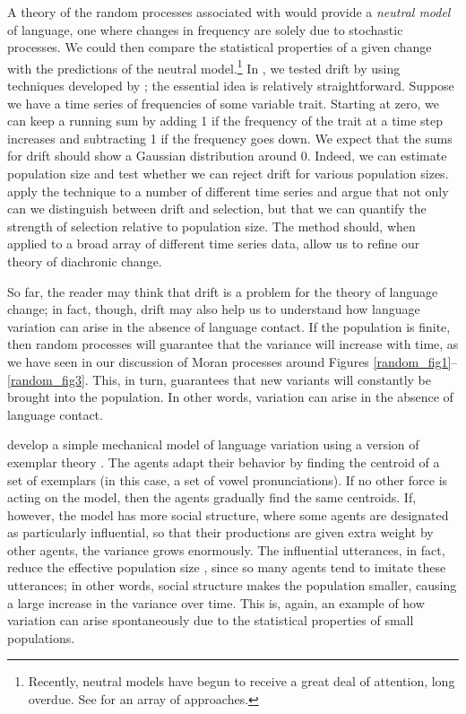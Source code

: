 \documentclass[output=paper]{langsci/langscibook}
\begin{document}
A theory of the random processes associated with  would
provide a \emph{neutral model} of language, one where changes in
frequency are solely due to stochastic processes.  We could then
compare the statistical properties of a given change with the
predictions of the neutral model.\footnote{Recently, neutral models
  have begun to receive a great deal of attention, long overdue.  See
  \citet{baxter-etal:2006, baxter-etal:2009, blythe:2012,
    blythe-croft:2012, kauhanen:2017, stadler-etal:2016} for an array
  of approaches.} In \citet{newberry-etal:2017}, we tested
drift by using techniques developed by \citet{feder_etal:2014}; the
essential idea is relatively straightforward.  Suppose we have a time
series of frequencies of some variable trait. Starting at zero, we can
keep a running sum by adding 1 if the frequency of the trait at a time
step increases and subtracting 1 if the frequency goes down.  We
expect that the sums for drift should show a Gaussian distribution
around 0.  Indeed, we can estimate population size and test whether we
can reject drift for various population
sizes. \citet{newberry-etal:2017} apply the technique to a
number of different time series and argue that not only can we
distinguish between drift and selection, but that we can quantify the
strength of selection relative to population size.  The method should,
when applied to a broad array of different time series data, allow us
to refine our theory of diachronic change.

So far, the reader may think that drift is a problem for the theory of language
change; in fact, though, drift may also help us to understand how language
variation can arise in the absence of language contact.  If the population is
finite, then random processes will guarantee that the variance will increase
with time, as we have seen in our discussion of Moran processes around Figures
\ref{random_fig1}--\ref{random_fig3}.  This, in turn, guarantees that new
variants will constantly be brought into the population.  In other words,
variation can arise in the absence of language contact.

\citet{clark-kimbrough:2015} develop a simple mechanical model of
language variation using a version of exemplar theory
\citep{murphy:2002}. The agents adapt their behavior by finding the
centroid of a set of exemplars (in this case, a set of vowel
pronunciations).  If no other force is acting on the model, then the
agents gradually find the same centroids.  If, however, the model has
more social structure, where some agents are designated as
particularly influential, so that their productions are given extra
weight by other agents, the variance grows enormously. The influential
utterances, in fact, reduce the effective population size
\citep{crow-kimura:1970}, since so many agents tend to imitate these
utterances; in other words, social structure makes the population
smaller, causing a large increase in the variance over time.  This is,
again, an example of how variation can arise spontaneously due to the
statistical properties of small populations.
\end{document}
